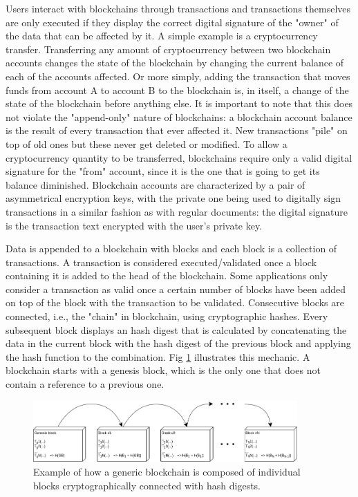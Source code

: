 \documentclass[../main.tex]{subfiles}
\begin{document}
\par
Users interact with blockchains through transactions and transactions themselves are only executed if they display the correct digital signature of the "owner" of the data that can be affected by it. A simple example is a cryptocurrency transfer. Transferring any amount of cryptocurrency between two blockchain accounts changes the state of the blockchain by changing the current balance of each of the accounts affected. Or more simply, adding the transaction that moves funds from account A to account B to the blockchain is, in itself, a change of the state of the blockchain before anything else. It is important to note that this does not violate the "append-only" nature of blockchains: a blockchain account balance is the result of every transaction that ever affected it. New transactions "pile" on top of old ones but these never get deleted or modified. To allow a cryptocurrency quantity to be transferred, blockchains require only a valid digital signature for the "from" account, since it is the one that is going to get its balance diminished. Blockchain accounts are characterized by a pair of asymmetrical encryption keys, with the private one being used to digitally sign transactions in a similar fashion as with regular documents: the digital signature is the transaction text encrypted with the user's private key.
\par
Data is appended to a blockchain with blocks and each block is a collection of transactions. A transaction is considered executed/validated once a block containing it is added to the head of the blockchain. Some applications only consider a transaction as valid once a certain number of blocks have been added on top of the block with the transaction to be validated. Consecutive blocks are connected, i.e., the "chain" in blockchain, using cryptographic hashes. Every subsequent block displays an hash digest that is calculated by concatenating the data in the current block with the hash digest of the previous block and applying the hash function to the combination. Fig \ref{fig:blockchain_example} illustrates this mechanic. A blockchain starts with a genesis block, which is the only one that does not contain a reference to a previous one.

\begin{figure}[htp]
    \centering
    \includegraphics[width=0.9\textwidth]{../Images/01_Blockchain.png}
    \caption{Example of how a generic blockchain is composed of individual blocks cryptographically connected with hash digests.}
    \label{fig:blockchain_example}
\end{figure}
\end{document}
